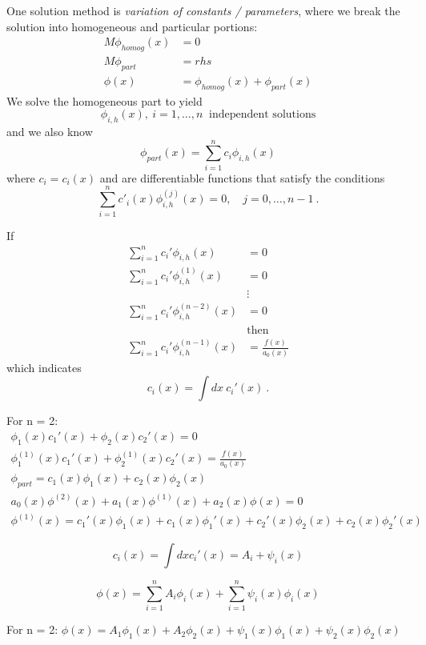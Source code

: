 \documentclass[12pt]{article}
\begin{document}
One solution method is \textit{variation of constants / parameters}, where we break the solution into homogeneous and particular portions:
\begin{align*}
M\phi_{homog}(x) &= 0 \\
M \phi_{part} &= rhs \\
\phi(x) &= \phi_{homog}(x) + \phi_{part}(x)
\end{align*}
%
We solve the homogeneous part to yield
\[\phi_{i,h}(x),  \:i = 1,\dotsc, n \:\text{ independent solutions}\]
%
and we also know
\[\phi_{part}(x) = \sum_{i=1}^n c_i\phi_{i,h}(x)\]
%
where $c_i = c_i(x)$ and are differentiable functions that satisfy the conditions
\[\sum_{i=1}^n c'_i(x) \phi^{(j)}_{i,h}(x) = 0, \quad j = 0, \dots, n-1 \:.\]

If 
\begin{align*}
\sum_{i=1}^n c_i'\phi_{i,h}(x) &= 0 \\
\sum_{i=1}^n c_i'\phi^{(1)}_{i,h}(x) &= 0 \\
&\vdots\\
\sum_{i=1}^n c_i'\phi^{(n-2)}_{i,h}(x) &= 0 \\
&\text{then} \\
\sum_{i=1}^n c_i'\phi^{(n-1)}_{i,h}(x) &= \frac{f(x)}{a_0(x)}
\end{align*}
which indicates
\begin{equation*}
c_i(x) = \int dx\:c_i'(x) \:.
\end{equation*}

For n = 2:
\vspace{-5 mm}
\begin{gather*}
\phi_1(x)c_1'(x) + \phi_2(x)c_2'(x) = 0 \\
\phi_1^{(1)}(x)c_1'(x) + \phi_2^{(1)}(x)c_2'(x) = \frac{f(x)}{a_0(x)} \\
\phi_{part} = c_1(x)\phi_1(x) + c_2(x)\phi_2(x) \\
a_0(x)\phi^{(2)}(x) + a_1(x)\phi^{(1)}(x) + a_2(x)\phi(x) = 0 \\
\phi^{(1)}(x) = c_1'(x)\phi_1(x) + c_1(x)\phi_1'(x) + c_2'(x)\phi_2(x) + c_2(x)\phi_2'(x)
\end{gather*}

\begin{equation*}
c_i(x) = \int dx c_i'(x) = A_i + \psi_i(x)
\end{equation*}

\begin{equation*}
\phi(x) = \sum_{i=1}^n A_i\phi_i(x) + \sum_{i=1}^n \psi_i(x)\phi_i(x)
\end{equation*}

For n = 2: $\phi(x) = A_1\phi_1(x) + A_2\phi_2(x) + \psi_1(x)\phi_1(x) + \psi_2(x)\phi_2(x)$
\end{document}
